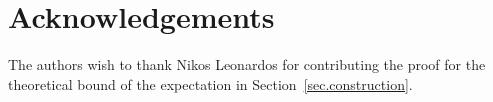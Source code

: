 \section*{Acknowledgements}
The authors wish to thank Nikos Leonardos for contributing the proof for the theoretical bound of the expectation in Section~\ref{sec.construction}.